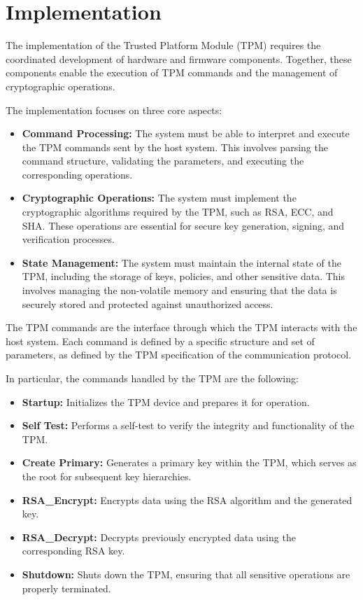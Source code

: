 
\chapter{Implementation}
\label{chap2}

The implementation of the Trusted Platform Module (TPM) 
requires the coordinated development of hardware and 
firmware components. 
Together, these components enable the execution of 
TPM commands and the management of cryptographic 
operations. 

The implementation focuses on three core aspects:
\begin{itemize}
    \item \textbf{Command Processing:} The system must
    be able to interpret and execute the TPM commands
    sent by the host system. This involves parsing the
    command structure, validating the parameters, and
    executing the corresponding operations.
    \item \textbf{Cryptographic Operations:} The system
    must implement the cryptographic algorithms required
    by the TPM, such as RSA, ECC, and SHA. These
    operations are essential for secure key generation,
    signing, and verification processes.
    \item \textbf{State Management:} The system must
    maintain the internal state of the TPM, including
    the storage of keys, policies, and other sensitive
    data. This involves managing the non-volatile memory
    and ensuring that the data is securely stored and
    protected against unauthorized access.
\end{itemize}

The TPM commands are the interface through which the
TPM interacts with the host system. Each command is
defined by a specific structure and set of parameters,
as defined by the TPM specification of the communication
protocol. 

In particular, the commands handled by the 
TPM are the following:
\begin{itemize}
    \item \textbf{Startup:} Initializes the TPM device 
    and prepares it for operation.
    \item \textbf{Self Test:} Performs a self-test to 
    verify the integrity and functionality of the TPM.
    \item \textbf{Create Primary:} Generates a primary key 
    within the TPM, which serves as the root for 
    subsequent key hierarchies.
    \item \textbf{RSA\_Encrypt:} Encrypts data using the 
    RSA algorithm and the generated key.
    \item \textbf{RSA\_Decrypt:} Decrypts previously 
    encrypted data using the corresponding RSA key.
    \item \textbf{Shutdown:} Shuts down the TPM, ensuring 
    that all sensitive operations are properly terminated.
\end{itemize}


